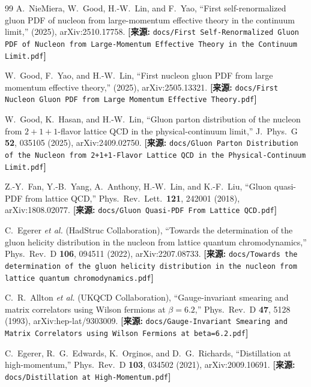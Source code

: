 \documentclass[12pt,a4paper]{ctexart}
\theoremstyle{definition}
\begin{document}
\begin{thebibliography}{99}
A.~NieMiera, W.~Good, H.-W.~Lin, and F.~Yao,
``First self-renormalized gluon PDF of nucleon from large-momentum effective theory in the continuum limit,''
(2025), arXiv:2510.17758.
\quad\textbf{[来源:} \texttt{docs/First Self-Renormalized Gluon PDF of Nucleon from Large-Momentum Effective Theory in the Continuum Limit.pdf}\textbf{]}

W.~Good, F.~Yao, and H.-W.~Lin,
``First nucleon gluon PDF from large momentum effective theory,''
(2025), arXiv:2505.13321.
\quad\textbf{[来源:} \texttt{docs/First Nucleon Gluon PDF from Large Momentum Effective Theory.pdf}\textbf{]}

W.~Good, K.~Hasan, and H.-W.~Lin,
``Gluon parton distribution of the nucleon from $2+1+1$-flavor lattice QCD in the physical-continuum limit,''
J.\ Phys.\ G \textbf{52}, 035105 (2025), arXiv:2409.02750.
\quad\textbf{[来源:} \texttt{docs/Gluon Parton Distribution of the Nucleon from 2+1+1-Flavor Lattice QCD in the Physical-Continuum Limit.pdf}\textbf{]}

Z.-Y.~Fan, Y.-B.~Yang, A.~Anthony, H.-W.~Lin, and K.-F.~Liu,
``Gluon quasi-PDF from lattice QCD,''
Phys.\ Rev.\ Lett.\ \textbf{121}, 242001 (2018), arXiv:1808.02077.
\quad\textbf{[来源:} \texttt{docs/Gluon Quasi-PDF From Lattice QCD.pdf}\textbf{]}


C.~Egerer \textit{et al.} (HadStruc Collaboration),
``Towards the determination of the gluon helicity distribution in the nucleon from lattice quantum chromodynamics,''
Phys.\ Rev.\ D \textbf{106}, 094511 (2022), arXiv:2207.08733.
\quad\textbf{[来源:} \texttt{docs/Towards the determination of the gluon helicity distribution in the nucleon from lattice quantum chromodynamics.pdf}\textbf{]}


C.~R.~Allton \textit{et al.} (UKQCD Collaboration),
``Gauge-invariant smearing and matrix correlators using Wilson fermions at $\beta=6.2$,''
Phys.\ Rev.\ D \textbf{47}, 5128 (1993), arXiv:hep-lat/9303009.
\quad\textbf{[来源:} \texttt{docs/Gauge-Invariant Smearing and Matrix Correlators using Wilson Fermions at beta=6.2.pdf}\textbf{]}

C.~Egerer, R.~G.~Edwards, K.~Orginos, and D.~G.~Richards,
``Distillation at high-momentum,''
Phys.\ Rev.\ D \textbf{103}, 034502 (2021), arXiv:2009.10691.
\quad\textbf{[来源:} \texttt{docs/Distillation at High-Momentum.pdf}\textbf{]}


\end{thebibliography}
\end{document}
